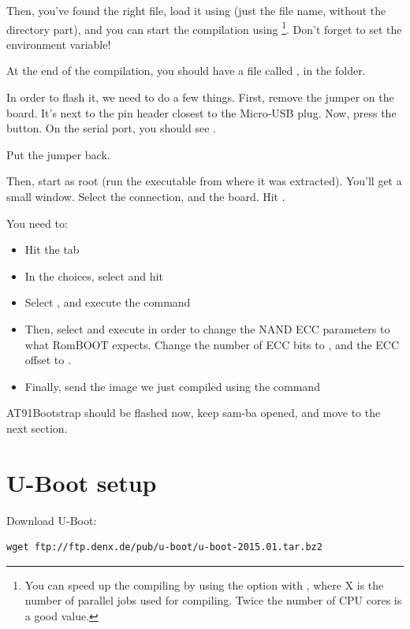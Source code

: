 Then, you've found the right  file, load it using
 (just the file name, without
the directory part), and you can start the compilation using
\footnote{You can speed up the compiling by using the
   option with , where X is the number of
  parallel jobs used for compiling. Twice the number of CPU cores is a
  good value.}. Don't forget to set the 
environment variable!

At the end of the compilation, you should have a file called
, in the
 folder.

In order to flash it, we need to do a few things. First, remove the
 jumper on the board. It's next to the pin header
closest to the Micro-USB plug. Now, press the  button.
On the serial port, you should see .

Put the jumper back.

Then, start  as root (run the executable from where it was
extracted). You'll get a small window. Select the 
connection, and the  board. Hit .

You need to:
\begin{itemize}
\item Hit the  tab
\item In the  choices, select 
      and hit 
\item Select , and execute the command
\item Then, select and execute 
  in order to change the NAND ECC parameters to what RomBOOT expects.
  Change the number of ECC bits to , and the ECC offset to
  .
\item Finally, send the image we just compiled using the command
\end{itemize}

AT91Bootstrap should be flashed now, keep sam-ba opened, and move to
the next section.

\section{U-Boot setup}

Download U-Boot:

\begin{verbatim}
wget ftp://ftp.denx.de/pub/u-boot/u-boot-2015.01.tar.bz2
\end{verbatim}

